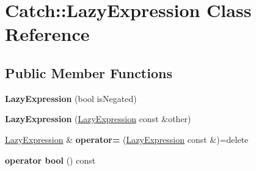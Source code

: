 \hypertarget{classCatch_1_1LazyExpression}{}\section{Catch\+:\+:Lazy\+Expression Class Reference}
\label{classCatch_1_1LazyExpression}
\subsection*{Public Member Functions}
\begin{DoxyCompactItemize}
\item 
{\bfseries Lazy\+Expression} (bool is\+Negated)\hypertarget{classCatch_1_1LazyExpression_a47186c2487bd4bf871e870ba8048553a}{}\label{classCatch_1_1LazyExpression_a47186c2487bd4bf871e870ba8048553a}

\item 
{\bfseries Lazy\+Expression} (\hyperlink{classCatch_1_1LazyExpression}{Lazy\+Expression} const \&other)\hypertarget{classCatch_1_1LazyExpression_ab82d5e94df0e159b018fbde0170e46f8}{}\label{classCatch_1_1LazyExpression_ab82d5e94df0e159b018fbde0170e46f8}

\item 
\hyperlink{classCatch_1_1LazyExpression}{Lazy\+Expression} \& {\bfseries operator=} (\hyperlink{classCatch_1_1LazyExpression}{Lazy\+Expression} const \&)=delete\hypertarget{classCatch_1_1LazyExpression_ae4ae00d4f36f084c369f2da36565a822}{}\label{classCatch_1_1LazyExpression_ae4ae00d4f36f084c369f2da36565a822}

\item 
{\bfseries operator bool} () const \hypertarget{classCatch_1_1LazyExpression_a5f3541ec933ad977b6a10ddf61b45adc}{}\label{classCatch_1_1LazyExpression_a5f3541ec933ad977b6a10ddf61b45adc}

\end{DoxyCompactItemize}
